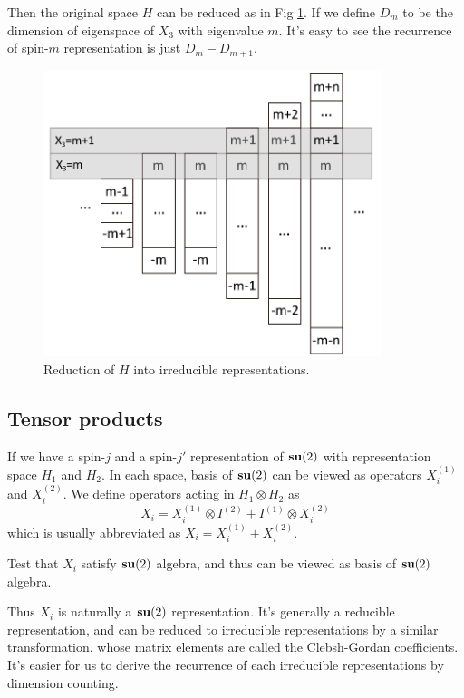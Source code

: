 \documentclass[12pt]{book}
\begin{document}
	Then the original space $H$ can be reduced as in Fig \ref{fig:su2s}. If we define $D_m$ to be the dimension of eigenspace of $X_3$ with eigenvalue $m$. It's easy to see the recurrence of spin-$m$ representation is just $D_m-D_{m+1}$.
	
	\begin{figure}[htb]
		\centering  
		\includegraphics[width=280pt]{resources/figures/3_2_su2s.pdf}
		\caption{Reduction of $H$ into irreducible representations.}
		\label{fig:su2s} 
	\end{figure}
	\subsection{Tensor products}
	If we have a spin-$j$ and a spin-$j'$ representation of ${\bf su}(2)$ with representation space $H_1$ and $H_2$. In each space, basis of ${\bf su}(2)$ can be viewed as operators $X_i^{(1)}$ and $X_i^{(2)}$. We define operators acting in $H_1\otimes H_2$ as
	\begin{equation}
		X_i=X_i^{(1)}\otimes I^{(2)}+I^{(1)}\otimes X_i^{(2)}
	\end{equation}
	which is usually abbreviated as $X_i=X_i^{(1)}+X_i^{(2)}$.
	
	
		Test that $X_i$ satisfy ${\bf su}(2)$ algebra, and thus can be viewed as basis of ${\bf su}(2)$ algebra.
		
	Thus $X_i$ is naturally a ${\bf su}(2)$ representation. It's generally a reducible representation, and can be reduced to irreducible representations by a similar transformation, whose matrix elements are called the Clebsh-Gordan coefficients. It's easier for us to derive the recurrence of each irreducible representations by dimension counting.
	
\end{document}
